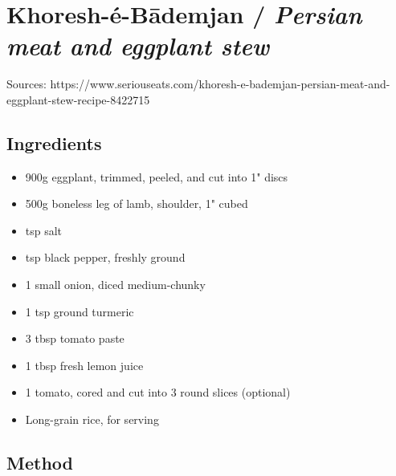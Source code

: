 \clearpage
\section{Khoresh-é-Bādemjan / \emph{Persian meat and eggplant stew}}


Sources: https://www.seriouseats.com/khoresh-e-bademjan-persian-meat-and-eggplant-stew-recipe-8422715

\subsection{Ingredients}

\begin{itemize}
    \item 900g eggplant, trimmed, peeled, and cut into 1" discs
    \item 500g boneless leg of lamb, shoulder, 1" cubed
    \item {} tsp salt
    \item {} tsp black pepper, freshly ground
    \item 1 small onion, diced medium-chunky
    \item 1 tsp ground turmeric
    \item 3 tbsp tomato paste
    \item 1 tbsp fresh lemon juice
    \item 1 tomato, cored and cut into 3 round slices (optional)
    \item Long-grain rice, for serving
\end{itemize}

\subsection{Method}

